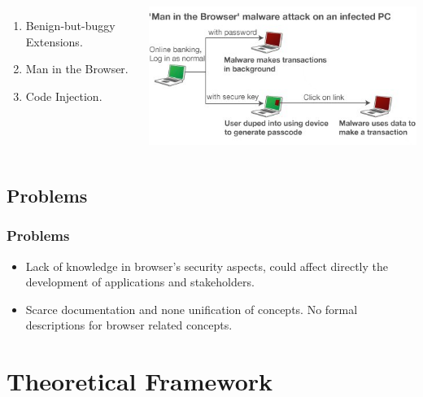 \documentclass[serif,9pt]{beamer}
\begin{document}
\begin{frame}
\begin{columns}
\begin{minipage}[c][0.4\textheight][c]{\linewidth}
\begin{enumerate}
	  \item Benign-but-buggy Extensions.
	  \item Man in the Browser.
	  \item Code Injection.
	  \end{enumerate}
	\end{minipage}
	\begin{minipage}[c][0.4\textheight][c]{\linewidth}
	  \centering
	  \includegraphics[scale=0.45]{figures/_58291188_malware_464v2.jpg}
	\end{minipage}
	\end{columns}
\end{frame}

\subsection{Problems}
\begin{frame}
	\frametitle{Problems}
	\begin{itemize}
		\item Lack of knowledge in browser's security aspects, could affect directly the development of applications and stakeholders. 
		\item Scarce documentation and none unification of concepts. No formal descriptions for browser related concepts.
	\end{itemize}
\end{frame}

\section{Theoretical Framework}
\end{document}
